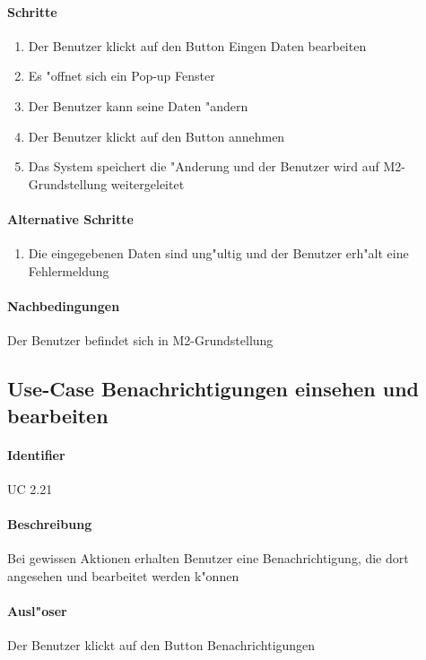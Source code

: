   \paragraph{Schritte}
  \begin{enumerate}
   \item Der Benutzer klickt auf den Button \dq Eingen Daten bearbeiten\dq
   \item Es "offnet sich ein Pop-up Fenster
   \item Der Benutzer kann seine Daten "andern
   \item Der Benutzer klickt auf den Button \dq annehmen\dq
   \item Das System speichert die "Anderung und der Benutzer wird auf M2-Grundstellung weitergeleitet
  \end{enumerate}

  \paragraph{Alternative Schritte}
  \begin{enumerate}
   \item Die eingegebenen Daten sind ung"ultig und der Benutzer erh"alt eine Fehlermeldung
  \end{enumerate}

  \paragraph{Nachbedingungen}
  Der Benutzer befindet sich in M2-Grundstellung

  
  \newpage
 \subsection{Use-Case Benachrichtigungen einsehen und bearbeiten}
  \paragraph{Identifier}
  UC 2.21
  \paragraph{Beschreibung}
  Bei gewissen Aktionen erhalten Benutzer eine Benachrichtigung, die dort angesehen und bearbeitet werden k"onnen
  \paragraph{Ausl"oser}
  Der Benutzer klickt auf den Button \dq Benachrichtigungen\dq

